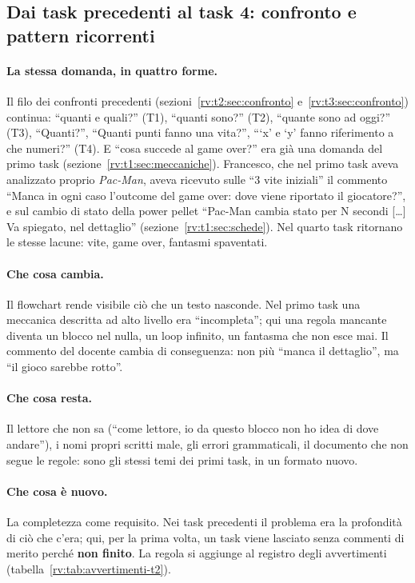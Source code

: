 \subsection{Dai task precedenti al task 4: confronto e pattern ricorrenti}
\label{rv:t4:sec:confronto}

\paragraph{La stessa domanda, in quattro forme.} Il filo dei confronti
precedenti (sezioni~\ref{rv:t2:sec:confronto} e~\ref{rv:t3:sec:confronto})
continua: ``quanti e quali?'' (T1), ``quanti sono?'' (T2), ``quante sono ad
oggi?'' (T3), ``Quanti?'', ``Quanti punti fanno una vita?'', ```x' e `y' fanno
riferimento a che numeri?'' (T4). E ``cosa succede al game over?'' era già una
domanda del primo task (sezione~\ref{rv:t1:sec:meccaniche}). Francesco, che
nel primo task aveva analizzato proprio \emph{Pac-Man}, aveva ricevuto sulle
``3 vite iniziali'' il commento ``Manca in ogni caso l'outcome del game over:
dove viene riportato il giocatore?'', e sul cambio di stato della power pellet
``Pac-Man cambia stato per N secondi [\dots] Va spiegato, nel dettaglio''
(sezione~\ref{rv:t1:sec:schede}). Nel quarto task ritornano le stesse
lacune: vite, game over, fantasmi spaventati.

\paragraph{Che cosa cambia.} Il flowchart rende visibile ciò che un testo
nasconde. Nel primo task una meccanica descritta ad alto livello era
``incompleta''; qui una regola mancante diventa un blocco nel nulla, un loop
infinito, un fantasma che non esce mai. Il commento del docente cambia di
conseguenza: non più ``manca il dettaglio'', ma ``il gioco sarebbe rotto''.

\paragraph{Che cosa resta.} Il lettore che non sa (``come lettore, io da
questo blocco non ho idea di dove andare''), i nomi propri scritti male, gli
errori grammaticali, il documento che non segue le regole: sono gli stessi
temi dei primi task, in un formato nuovo.

\paragraph{Che cosa è nuovo.} La completezza come requisito. Nei task
precedenti il problema era la profondità di ciò che c'era; qui, per la prima
volta, un task viene lasciato senza commenti di merito perché \textbf{non
finito}. La regola si aggiunge al registro degli avvertimenti
(tabella~\ref{rv:tab:avvertimenti-t2}).

